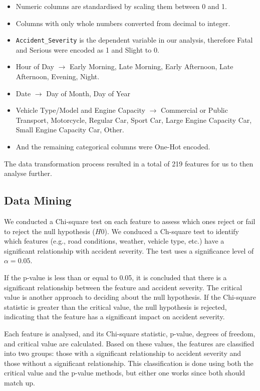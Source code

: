 \begin{itemize}
    \item Numeric columns are standardised by scaling them between 0 and 1.
    \item Columns with only whole numbers converted from decimal to integer.
    \item \verb|Accident_Severity| is the dependent variable in our analysis, therefore Fatal and Serious were encoded as 1 and Slight to 0.
    \item Hour of Day $\rightarrow$  Early Morning, Late Morning, Early Afternoon, Late Afternoon, Evening, Night.
    \item Date $\rightarrow$ Day of Month, Day of Year
    \item Vehicle Type/Model and Engine Capacity $\rightarrow$ Commercial or Public Transport, Motorcycle, Regular Car, Sport Car, Large Engine Capacity Car, Small Engine Capacity Car, Other.
    \item And the remaining categorical columns were One-Hot encoded.
\end{itemize}

The data transformation process resulted in a total of 219 features for us to then analyse further.

\subsection{Data Mining}\label{subsec:data-mining}

We conducted a Chi-square test on each feature to assess which ones reject or fail to reject the null hypothesis ($H0$).
We conduced a Ch-square test to identify which features (e.g., road conditions, weather, vehicle type, etc.) have a significant relationship with accident severity.
The test uses a significance level of $\alpha=0.05$.

If the p-value is less than or equal to 0.05, it is concluded that there is a significant relationship between the feature and accident severity.
The critical value is another approach to deciding about the null hypothesis.
If the Chi-square statistic is greater than the critical value, the null hypothesis is rejected, indicating that the feature has a significant impact on accident severity.

Each feature is analysed, and its Chi-square statistic, p-value, degrees of freedom, and critical value are calculated.
Based on these values, the features are classified into two groups: those with a significant relationship to accident severity and those without a significant relationship.
This classification is done using both the critical value and the p-value methods, but either one works since both should match up.

